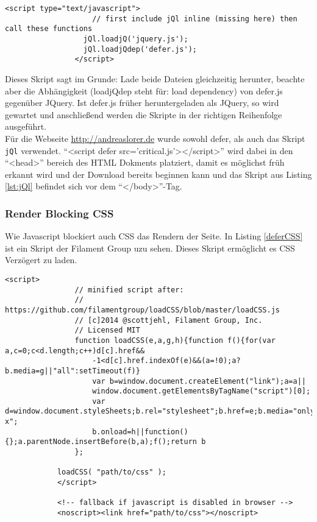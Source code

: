 			\begin{lstlisting}[captionpos=b, caption=jQl asynchronous jQuery-Loader, label=lst:jQl]
				<script type="text/javascript">
					// first include jQl inline (missing here) then call these functions
				  jQl.loadjQ('jquery.js');
				  jQl.loadjQdep('defer.js');
				</script>
			\end{lstlisting}

			Dieses Skript sagt im Grunde: Lade beide Dateien gleichzeitig herunter, beachte aber die Abhängigkeit (loadjQdep steht für: load dependency) von defer.js gegenüber JQuery. Ist defer.js früher heruntergeladen als JQuery, so wird gewartet und anschließend werden die Skripte in der richtigen Reihenfolge ausgeführt.\\

			Für die Webseite \url{http://andreaslorer.de} wurde sowohl defer, als auch das Skript \texttt{jQl} verwendet. "`<script defer src='critical.js'></script>"' wird dabei in den "`<head>"' bereich des HTML Dokments platziert, damit es möglichst früh erkannt wird und der Download bereits beginnen kann und das Skript aus Listing \ref{lst:jQl} befindet sich vor dem "`</body>"'-Tag.


		\subsubsection{Render Blocking CSS} %
		\label{ssub:render_blocking_css}
			Wie Javascript blockiert auch CSS das Rendern der Seite. In Listing \ref{deferCSS} ist ein Skript der Filament Group uzu sehen. Dieses Skript ermöglicht es CSS Verzögert zu laden. 

			\begin{lstlisting}[captionpos=b, caption=load a CSS file asynchronously, label=lst:deferCSS, breaklines=false]
			<script>
				// minified script after: 
				// https://github.com/filamentgroup/loadCSS/blob/master/loadCSS.js
				// [c]2014 @scottjehl, Filament Group, Inc.
				// Licensed MIT
	 			function loadCSS(e,a,g,h){function f(){for(var a,c=0;c<d.length;c++)d[c].href&&
	 				-1<d[c].href.indexOf(e)&&(a=!0);a?b.media=g||"all":setTimeout(f)}
	 				var b=window.document.createElement("link");a=a||
	 				window.document.getElementsByTagName("script")[0];
	 				var d=window.document.styleSheets;b.rel="stylesheet";b.href=e;b.media="only x";
	 				b.onload=h||function(){};a.parentNode.insertBefore(b,a);f();return b
	 			};

	  		loadCSS( "path/to/css" );
			</script>

			<!-- fallback if javascript is disabled in browser -->
			<noscript><link href="path/to/css"></noscript>
			\end{lstlisting}

